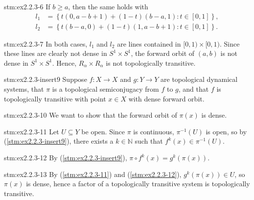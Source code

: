 \begin{statement}{stm:ex2.2.3-6}
If $b \geq a$, then the same holds with
\begin{align*}
l_1 &= \left\{ t(0, a-b+1) + (1 - t)(b - a, 1) : t \in [0,1] \right\}, \\
l_2 &= \left\{ t(b-a, 0) + (1 - t)(1, a-b+1) : t \in [0,1] \right\}.
\end{align*}
\end{statement}

\begin{statement}{stm:ex2.2.3-7}
In both cases, $l_1$ and $l_2$ are lines contained in $[0,1) \times [0,1)$. Since these lines are clearly not dense in $S^1 \times S^1$, the forward orbit of $(a,b)$ is not dense in $S^1 \times S^1$. Hence, $R_\alpha \times R_\alpha$ is not topologically transitive.
\end{statement}

\begin{statement}{stm:ex2.2.3-insert9}
Suppose $f: X \to X$ and $g: Y \to Y$ are topological dynamical systems, that $\pi$ is a topological semiconjugacy from $f$ to $g$, and that $f$ is topologically transitive with point $x \in X$ with dense forward orbit.
\end{statement}

\begin{explanation}{stm:ex2.2.3-10}
We want to show that the forward orbit of $\pi(x)$ is dense.
\end{explanation}

\begin{statement}{stm:ex2.2.3-11}
Let $U \subseteq Y$ be open. Since $\pi$ is continuous, $\pi^{-1}(U)$ is open, so by (\ref{stm:ex2.2.3-insert9}), there exists a $k \in \mathbb{N}$ such that $f^k(x) \in \pi^{-1}(U)$.
\end{statement}

\begin{statement}{stm:ex2.2.3-12}
By (\ref{stm:ex2.2.3-insert9}), $\pi \circ f^k(x) = g^k(\pi(x))$.
\end{statement}

\begin{statement}{stm:ex2.2.3-13}
By (\ref{stm:ex2.2.3-11}) and (\ref{stm:ex2.2.3-12}), $g^k(\pi(x)) \in U$, so $\pi(x)$ is dense, hence a factor of a topologically transitive system is topologically transitive.
\end{statement}
